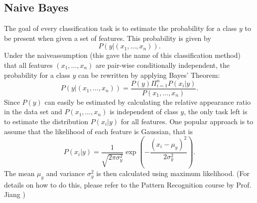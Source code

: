 \subsection{Naive Bayes}\label{subsec:naive_bayes}
The goal of every classification task is to estimate the probability for a class $y$ to be present when given a set of features. This probability is given by
\begin{equation}
	P(y|(x_1,\dots,x_n)).
\end{equation}
Under the \glqq naive\grqq assumption (this gave the name of this classification method) that all features $(x_1,\dots,x_n)$ are pair-wise conditionally independent, the probability for a class $y$ can be rewritten by applying Bayes' Theorem:
\begin{equation}
	P(y|(x_1,\dots,x_n)) = \frac{P(y)\Pi_{i=1}^{n} P(x_i|y)}{P(x_1,\dots,x_n)}.
\end{equation}
Since $P(y)$ can easily be estimated by calculating the relative appearance ratio in the data set and $P(x_1,\dots,x_n)$ is independent of class $y$, the only task left is to estimate the distribution $P(x_i|y)$ for all features. One popular approach is to assume that the likelihood of each feature is Gaussian, that is
\begin{equation}
	P(x_i|y) = \frac{1}{\sqrt{2\pi \sigma_y^2}}\exp\left(-\frac{(x_i-\mu_y)^2}{2\sigma_y^2}\right).
\end{equation}
The mean $\mu_y$ and variance $\sigma_y^2$ is then calculated using maximum likelihood. (For details on how to do this, please refer to the Pattern Recognition course by Prof. Jiang \cite{Jiang})